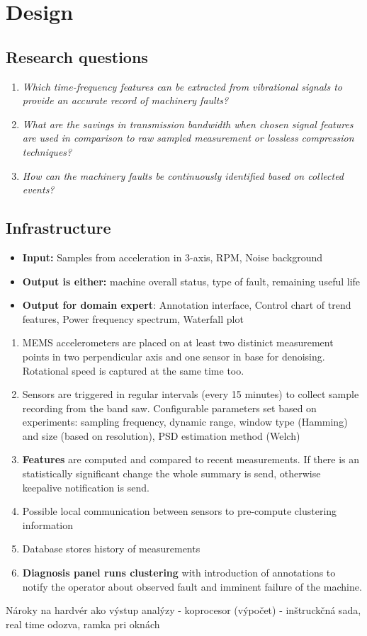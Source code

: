 \chapter{Design}

\section{Research questions}
\begin{enumerate}
\item \emph{Which time-frequency features can be extracted from vibrational signals to provide an accurate record of machinery faults?}
\item \emph{What are the savings in transmission bandwidth when chosen signal features are used in comparison to raw sampled measurement or lossless compression techniques?}
\item \emph{How can the machinery faults be continuously identified based on collected events?}
\end{enumerate}

\section{Infrastructure}
 \begin{itemize}
\item \textbf{Input:} Samples from acceleration in 3-axis, RPM, Noise background
\item \textbf{Output is either:} machine overall status, type of fault, remaining useful life
\item \textbf{Output for domain expert}: Annotation interface, Control chart of trend features, Power frequency spectrum, Waterfall plot
 \end{itemize}

\begin{enumerate}
\item MEMS accelerometers are placed on at least two distinict measurement points in two perpendicular axis and one sensor in base for denoising. Rotational speed is captured at the same time too.
\item Sensors are triggered in regular intervals (every 15 minutes) to collect sample recording from the band saw. Configurable parameters set based on experiments: sampling frequency, dynamic range, window type (Hamming) and size (based on resolution), PSD estimation method (Welch)
\item \textbf{Features} are computed and compared to recent measurements. If there is an statistically significant change the whole summary is send, otherwise keepalive notification is send.
\item Possible local communication between sensors to pre-compute clustering information
\item Database stores history of measurements
\item \textbf{Diagnosis panel runs clustering} with introduction of annotations to notify the operator about observed fault and imminent failure of the machine.
\end{enumerate}

Nároky na hardvér ako výstup analýzy - koprocesor (výpočet) - inštruckčná sada, real time odozva, ramka pri oknách


